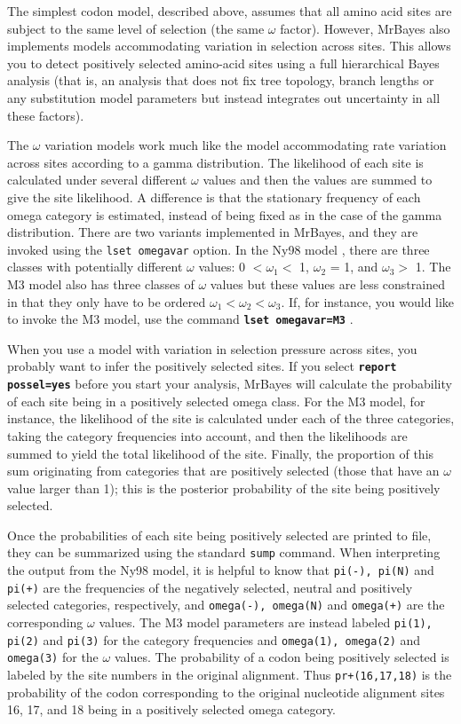 \documentclass[12pt]{book}
\newcommand{\ttt}[1]{\texttt{#1} }
\newcommand{\tb}[1]{\texttt{\textbf{#1}} }
\begin{document}
The simplest codon model, described above, assumes that all amino acid sites are subject
to the same level of selection (the same $\omega$ factor). However, MrBayes also implements
models accommodating variation in selection across sites. This allows you to detect
positively selected amino-acid sites using a full hierarchical Bayes analysis (that is, an
analysis that does not fix tree topology, branch lengths or any substitution model
parameters but instead integrates out uncertainty in all these factors).

The $\omega$ variation models work much like the model accommodating rate variation across
sites according to a gamma distribution. The likelihood of each site is calculated under
several different $\omega$ values and then the values are summed to give the site likelihood. A
difference is that the stationary frequency of each omega category is estimated, instead of
being fixed as in the case of the gamma distribution. There are two variants implemented
in MrBayes, and they are invoked using the \ttt{lset omegavar} option. In the Ny98
model \citep{nielsen98}, there are three classes with potentially different $\omega$
values: 0 $< \omega_1 <$ 1, $\omega_2$ = 1, and $\omega_3 >$ 1. The M3 model also has three classes of 
$\omega$ values but these values are less constrained in that they only have to be ordered 
$\omega_1 < \omega_2 < \omega_3$. 
If, for instance, you would like to invoke the M3 model, use the command \tb{lset omegavar=M3}.

When you use a model with variation in selection pressure across sites, you probably
want to infer the positively selected sites. If you select \tb{report possel=yes} before
you start your analysis, MrBayes will calculate the probability of each site being in a
positively selected omega class. For the M3 model, for instance, the likelihood of the site
is calculated under each of the three categories, taking the category frequencies into
account, and then the likelihoods are summed to yield the total likelihood of the site.
Finally, the proportion of this sum originating from categories that are positively selected
(those that have an $\omega$ value larger than 1); this is the posterior probability of the site being
positively selected.

Once the probabilities of each site being positively selected are printed to file, they can be
summarized using the standard \ttt{sump} command. When interpreting the output from the
Ny98 model, it is helpful to know that \ttt{pi(-), pi(N)} and \ttt{pi(+)} are the frequencies of
the negatively selected, neutral and positively selected categories, respectively, and
\ttt{omega(-), omega(N)} and \ttt{omega(+)} are the corresponding $\omega$ values. The M3 model
parameters are instead labeled \ttt{pi(1), pi(2)} and \ttt{pi(3)} for the category frequencies
and \ttt{omega(1), omega(2)} and \ttt{omega(3)} for the $\omega$ values. The probability of a
codon being positively selected is labeled by the site numbers in the original alignment.
Thus \ttt{pr+(16,17,18)} is the probability of the codon corresponding to the original
nucleotide alignment sites 16, 17, and 18 being in a positively selected omega category.
\end{document}
